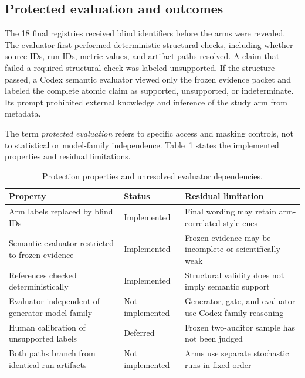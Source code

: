 \documentclass[11pt]{article}
\begin{document}
\subsection{Protected evaluation and outcomes}

The 18 final registries received blind identifiers before the arms were revealed. The evaluator first performed deterministic structural checks, including whether source IDs, run IDs, metric values, and artifact paths resolved. A claim that failed a required structural check was labeled unsupported. If the structure passed, a Codex semantic evaluator viewed only the frozen evidence packet and labeled the complete atomic claim as supported, unsupported, or indeterminate. Its prompt prohibited external knowledge and inference of the study arm from metadata.

The term \emph{protected evaluation} refers to specific access and masking controls, not to statistical or model-family independence. Table~\ref{tab:protection} states the implemented properties and residual limitations.

\begin{table}[H]
\centering
\caption{Protection properties and unresolved evaluator dependencies.}
\label{tab:protection}
\small
\begin{tabularx}{\textwidth}{>{\raggedright\arraybackslash}X l >{\raggedright\arraybackslash}X}
\toprule
Property & Status & Residual limitation \\
\midrule
Arm labels replaced by blind IDs & Implemented & Final wording may retain arm-correlated style cues \\
Semantic evaluator restricted to frozen evidence & Implemented & Frozen evidence may be incomplete or scientifically weak \\
References checked deterministically & Implemented & Structural validity does not imply semantic support \\
Evaluator independent of generator model family & Not implemented & Generator, gate, and evaluator use Codex-family reasoning \\
Human calibration of unsupported labels & Deferred & Frozen two-auditor sample has not been judged \\
Both paths branch from identical run artifacts & Not implemented & Arms use separate stochastic runs in fixed order \\
\bottomrule
\end{tabularx}
\end{table}
\end{document}
